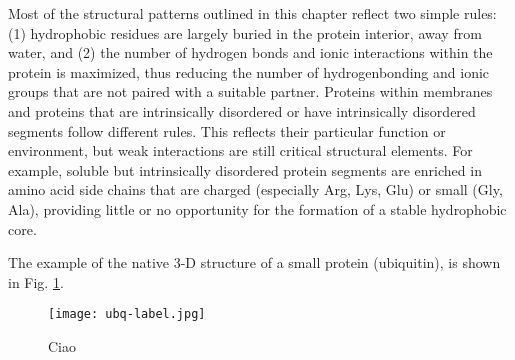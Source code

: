 Most of the structural patterns outlined in this chapter reflect two simple rules: (1) hydrophobic residues are largely buried in the protein interior, away from water, and (2) the number of hydrogen bonds and ionic interactions within the protein is maximized, thus reducing the number of hydrogenbonding and ionic groups that are not paired with a suitable partner. Proteins within membranes and proteins that are intrinsically disordered or have intrinsically disordered segments follow different rules. This reflects their particular function or environment, but weak interactions are still critical structural elements. For example, soluble but intrinsically disordered protein segments are enriched in amino acid side chains that are charged (especially Arg, Lys, Glu) or small (Gly, Ala), providing little or no opportunity for the formation of a stable hydrophobic core. 

The example of the native 3-D structure of a small protein (ubiquitin), is shown in Fig. \ref{fig:ubq}.

\begin{figure}[h]
\centering
\begin{minipage}[t]{0.8\textwidth}
\centering
\texttt{[image: ubq-label.jpg]}

\caption{\small{Ciao}}

\label{fig:ubq}
\end{minipage} 
\end{figure}

